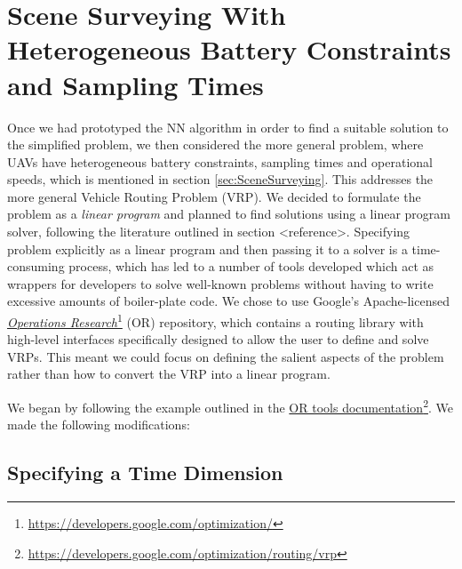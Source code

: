 \section{Scene Surveying With Heterogeneous Battery Constraints and Sampling Times}

Once we had prototyped the NN algorithm in order to find a suitable solution to the simplified problem, we then considered the more general problem, where UAVs have heterogeneous battery constraints, sampling times and operational speeds, which is mentioned in section \ref{sec:SceneSurveying}. This addresses the more general Vehicle Routing Problem (VRP). We decided to formulate the problem as a \textit{linear program} and planned to find solutions using a linear program solver, following the literature outlined in section <reference>. 
Specifying problem explicitly as a linear program and then passing it to a solver is a time-consuming process, which has led to a number of tools developed which act as wrappers for developers to solve well-known problems without having to write excessive amounts of boiler-plate code. We chose to use Google's Apache-licensed \href{https://developers.google.com/optimization/}{\textit{Operations Research}}\footnote{\href {https://developers.google.com/optimization/}{https://developers.google.com/optimization/}} (OR) repository, which contains a routing library with high-level interfaces specifically designed to allow the user to define and solve VRPs. This meant we could focus on defining the salient aspects of the problem rather than how to convert the VRP into a linear program.

We began by following the example outlined in the \href{https://developers.google.com/optimization/routing/vrp}{OR tools documentation}\footnote{\href {https://developers.google.com/optimization/routing/vrp}{https://developers.google.com/optimization/routing/vrp}}. We made the following modifications:

\subsection{}

\subsection{Specifying a Time Dimension}

